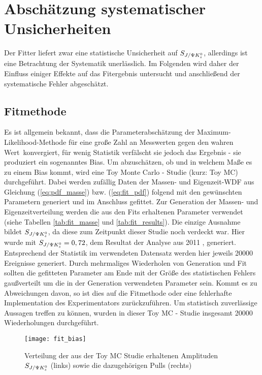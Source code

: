 \chapter{Abschätzung systematischer Unsicherheiten} \label{kap:systematik}
Der Fitter liefert zwar eine statistische Unsicherheit auf $S_{J/\Psi K_s^0}$, allerdings ist eine Betrachtung der Systematik unerlässlich. Im Folgenden wird daher der Einfluss einiger Effekte auf das Fitergebnis untersucht und anschließend der systematische Fehler abgeschätzt.

\section{Fitmethode} \label{kap:fit_bias}
Es ist allgemein bekannt, dass die Parameterabschätzung der Maximum-Like\-li\-hood-Methode für eine große Zahl an Messwerten gegen den \glqq wahren Wert\grqq\ konvergiert, für wenig Statistik verfälscht sie jedoch das Ergebnis - sie produziert ein sogenanntes Bias. Um abzuschätzen, ob und in welchem Maße es zu einem Bias kommt, wird eine Toy Monte Carlo - Studie (kurz: Toy MC) durchgeführt. Dabei werden zufällig Daten der Massen- und Eigenzeit-WDF aus Gleichung (\ref{eq:pdf_masse}) bzw. (\ref{eq:fit_pdf}) folgend mit den gewünschten Parametern generiert und im Anschluss gefittet. Zur Generation der Massen- und Eigenzeitverteilung werden die aus den Fits erhaltenen Parameter verwendet (siehe Tabellen \ref{tab:fit_masse} und \ref{tab:fit_results}). Die einzige Ausnahme bildet $S_{J/\Psi K_s^0}$, da diese zum Zeitpunkt dieser Studie noch verdeckt war. Hier wurde mit $S_{J/\Psi K_s^0} = 0,72$, dem Resultat der Analyse aus 2011 \cite{lhcb-paper}, generiert. Entsprechend der Statistik im verwendeten Datensatz werden hier jeweils 20000 Ereignisse generiert. Durch mehrmaliges Wiederholen von Generation und Fit sollten die gefitteten Parameter am Ende mit der Größe des statistischen Fehlers gaußverteilt um die in der Generation verwendeten Parameter sein. Kommt es zu Abweichungen davon, so ist dies auf die Fitmethode oder eine fehlerhafte Implementation des Experimentators zurückzuführen. Um statistisch zuverlässige Aussagen treffen zu können, wurden in dieser Toy MC - Studie insgesamt 20000 Wiederholungen durchgeführt.

\begin{figure}[hptb]
\centering
\texttt{[image: fit\_bias]}
\caption{Verteilung der aus der Toy MC Studie erhaltenen Amplituden $S_{J/\Psi K_s^0}$ (links) sowie die dazugehörigen Pulls (rechts)}
\label{fig:fit_bias}
\end{figure}

